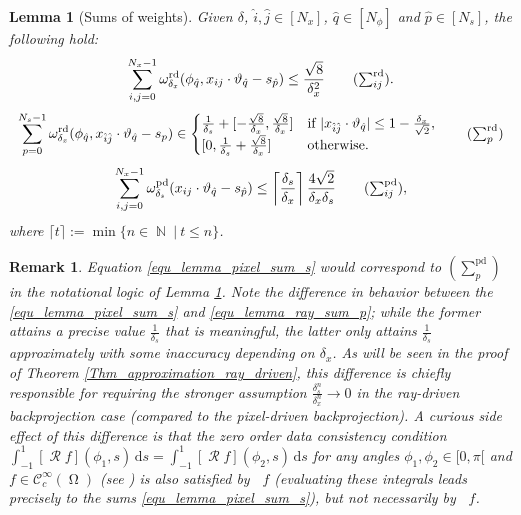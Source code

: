 \documentclass[11pt,reqno]{amsart}
\newcommand{\sumx}{\sum_{i,j=0}^{N_x-1}}
\newcommand{\sums}{\sum_{p=0}^{N_s-1}}
\DeclareMathOperator{\NN}{\mathbb{N}}
\DeclareMathOperator{\Radon}{\mathcal{R}}
\DeclareMathOperator{\RayRadon}{\mathcal{R}^\mathrm{rd}_{\delta}}
\DeclareMathOperator{\PixelRadon}{\mathcal{R}^\mathrm{pd}_{\delta}}
\DeclareMathOperator{\RayWeight}{\omega^\mathrm{rd}_{\delta_\mathit{x}}}
\DeclareMathOperator{\PixelWeight}{\omega^\mathrm{pd}_{\delta_\mathit{s}}}
\DeclareMathOperator{\imgdom}{\Omega}
\newcommand{\dd}[1]{\,\mathrm{d}{#1}}
\numberwithin{theorem}{section}
\newtheorem{lemma}[theorem]{Lemma}
\newtheorem{remark}[theorem]{Remark}
\theoremstyle{remark}
\begin{document}
\begin{lemma}[Sums of weights]
\label{Lemma_sums_weights}
    Given $\delta$, $\hat i,\hat j\in [N_x]$, $\hat q\in [N_\phi]$ and $\hat p\in [N_s]$, the following hold:
     \begin{equation} \label{equ_lemma_ray_sum_x}
        \sumx \RayWeight(\phi_{\hat q},x_{ij}\cdot \vartheta_{\hat q}-s_{\hat p}) \leq \frac{\sqrt{8}}{\delta_x^2}
        \tag{$\sum^\mathrm{rd}_{ij}$}.
    \end{equation}
     \begin{equation}\label{equ_lemma_ray_sum_p}
        \sums \RayWeight(\phi_{\hat q}, x_{\hat i \hat j}\cdot \vartheta_{\hat q} - s_p) \in \begin{cases}  \frac{1}{\delta_s}+   [-{\frac{\sqrt{8}}{\delta_x}},{\frac{\sqrt{8}}{\delta_x}}] 
       & \text{if }|x_{\hat i \hat j}\cdot\vartheta_{\hat q} |\leq 1 - \frac{\delta_x}{\sqrt{2}},
        \\
        [0,\frac{1}{\delta_s}+{\frac{\sqrt{8}}{\delta_x}}] & \text{otherwise}.
        \end{cases}
       \tag{$\sum^\mathrm{rd}_{p}$}  
    \end{equation}
     \begin{equation}\label{equ_lemma_pixel_sum}
         \sumx \PixelWeight(x_{ij}\cdot \vartheta_{\hat q}-s_{\hat p}) \leq \left\lceil\frac{\delta_s}{\delta_x}\right\rceil \frac{4\sqrt{2}   }{\delta_x\delta_s}
        \tag{$\sum^\mathrm{pd}_{ij}$},
    \end{equation}
    where $\lceil t\rceil := \min \{n\in \NN \ |\ t\leq n\}$.
\end{lemma}


\begin{remark}
Equation \eqref{equ_lemma_pixel_sum_s} would correspond to $(\sum_{p}^{\mathrm {pd}})$ in the notational logic of Lemma \ref{Lemma_sums_weights}. Note the difference in behavior between the \eqref{equ_lemma_pixel_sum_s} and \eqref{equ_lemma_ray_sum_p}; while the former attains a precise value $\frac{1}{\delta_s}$ that is meaningful, the latter only attains $\frac{1}{\delta_s}$ approximately with some inaccuracy depending on $\delta_x$. As will be seen in the proof of Theorem \ref{Thm_approximation_ray_driven}, this difference is chiefly responsible for requiring the stronger assumption $\frac{\delta_s^n}{\delta_x^n}\to 0$ in the ray-driven backprojection case (compared to the pixel-driven backprojection). A curious side effect of this difference is that the zero order data consistency condition
$\int_{-1}^1 [\Radon f] (\phi_1,s)\dd s= \int_{-1}^1  [\Radon f] (\phi_2,s)\dd s$ for any angles $\phi_1,\phi_2 \in [0,\pi[$ and $f\in \mathcal{C}^\infty_c(\imgdom)$ (see \cite{WOS:A1960WE64800004}) is also satisfied by $\PixelRadon f$ (evaluating these integrals leads precisely to the sums \eqref{equ_lemma_pixel_sum_s}), but not necessarily by $\RayRadon f$. 
\end{remark}
\end{document}
